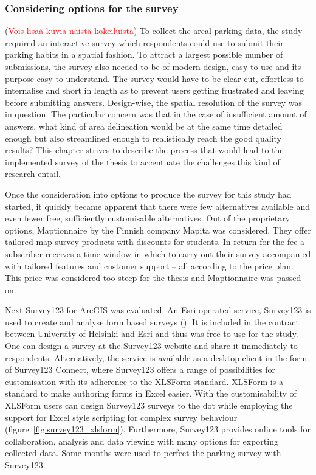 \subsubsection{Considering options for the survey}
\justify
(\textcolor{red}{Vois lisää kuvia näistä kokeiluista}) To collect the areal parking data, the study required an interactive survey which respondents could use to submit their parking habits in a spatial fashion. To attract a largest possible number of submissions, the survey also needed to be of modern design, easy to use and its purpose easy to understand. The survey would have to be clear-cut, effortless to internalise and short in length as to prevent users getting frustrated and leaving before submitting answers. Design-wise, the spatial resolution of the survey was in question. The particular concern was that in the case of insufficient amount of answers, what kind of area delineation would be at the same time detailed enough but also streamlined enough to realistically reach the good quality results? This chapter strives to describe the process that would lead to the implemented survey of the thesis to accentuate the challenges this kind of research entail.

Once the consideration into options to produce the survey for this study had started, it quickly became apparent that there were few alternatives available and even fewer free, sufficiently customisable alternatives. Out of the proprietary options, Maptionnaire by the Finnish company Mapita was considered. They offer tailored map survey products with discounts for students. In return for the fee a subscriber receives a time window in which to carry out their survey accompanied with tailored features and customer support -- all according to the price plan. This price was considered too steep for the thesis and Maptionnaire was passed on. 

Next Survey123 for ArcGIS was evaluated. An Esri operated service, Survey123 is used to create and analyse form based surveys (\cite{Esri}). It is included in the contract between University of Helsinki and Esri and thus was free to use for the study. One can design a survey at the Survey123 website and share it immediately to respondents. Alternatively, the service is available as a desktop client in the form of Survey123 Connect, where Survey123 offers a range of possibilities for customisation with its adherence to the XLSForm standard. XLSForm is a standard to make authoring forms in Excel easier. With the customisability of XLSForm users can design Survey123 surveys to the dot while employing the support for Excel style scripting for complex survey behaviour (figure~\ref{fig:survey123_xlsform}). Furthermore, Survey123 provides online tools for collaboration, analysis and data viewing with many options for exporting collected data. Some months were used to perfect the parking survey with Survey123. 

